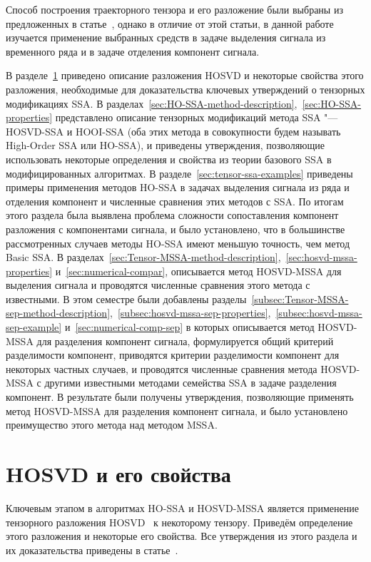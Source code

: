 \documentclass[specialist,
    substylefile = spbu_report.rtx,
    subf,href,colorlinks=true, 12pt]{disser}
\theoremstyle{plain}
\theoremstyle{definition}
\theoremstyle{remark}
\begin{document}
    Способ построения траекторного тензора и его разложение были выбраны из предложенных в
    статье~\cite{hosvd-hooi-separation}, однако в отличие от этой статьи, в данной работе изучается применение
    выбранных средств в задаче выделения сигнала из временного ряда и в задаче отделения компонент сигнала.

    В разделе~\ref{sec:hosvd} приведено описание разложения HOSVD и некоторые свойства этого разложения,
    необходимые для доказательства ключевых утверждений о тензорных модификациях SSA.
    В разделах~\ref{sec:HO-SSA-method-description},~\ref{sec:HO-SSA-properties} представлено описание
    тензорных модификаций метода SSA "--- HOSVD-SSA и HOOI-SSA (оба этих метода в совокупности будем называть
    High-Order SSA или HO-SSA), и приведены утверждения, позволяющие использовать некоторые определения и
    свойства из теории базового SSA в модифицированных алгоритмах.
    В разделе~\ref{sec:tensor-ssa-examples} приведены примеры применения методов HO-SSA в задачах выделения сигнала
    из ряда и отделения компонент и численные сравнения этих методов с SSA. По итогам этого раздела была
    выявлена проблема сложности сопоставления компонент разложения с компонентами сигнала, и было установлено,
    что в большинстве рассмотренных случаев методы HO-SSA имеют меньшую точность, чем метод Basic SSA.
    В разделах~\ref{sec:Tensor-MSSA-method-description},~\ref{sec:hosvd-mssa-properties} и~\ref{sec:numerical-compar},
    описывается метод HOSVD-MSSA для выделения сигнала и проводятся численные сравнения этого метода
    с известными.
    В этом семестре были добавлены разделы~\ref{subsec:Tensor-MSSA-sep-method-description},~\ref{subsec:hosvd-mssa-sep-properties},~\ref{subsec:hosvd-mssa-sep-example} 
    и~\ref{sec:numerical-comp-sep} в которых описывается метод HOSVD-MSSA для
    разделения компонент сигнала, формулируется общий критерий разделимости компонент, приводятся критерии
    разделимости компонент для некоторых частных случаев, и проводятся численные сравнения метода HOSVD-MSSA
    с другими известными методами семейства SSA в задаче разделения компонент.
    В результате были получены утверждения, позволяющие применять метод HOSVD-MSSA для 
    разделения компонент сигнала, и было установлено преимущество этого метода над методом MSSA.
    \newpage


    \section{HOSVD и его свойства}\label{sec:hosvd}
    Ключевым этапом в алгоритмах HO-SSA и HOSVD-MSSA является применение тензорного разложения HOSVD~\cite{hosvd} к некоторому тензору.
    Приведём определение этого разложения и некоторые его свойства.
    Все утверждения из этого раздела и их доказательства приведены в статье~\cite{hosvd}.
\end{document}
